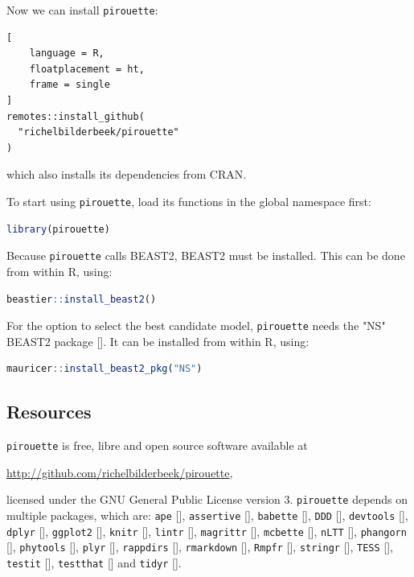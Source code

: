 Now we can install \verb;pirouette;:
\begin{lstlisting}[
    language = R,
    floatplacement = ht,
    frame = single
]
remotes::install_github(
  "richelbilderbeek/pirouette"
)
\end{lstlisting}
which also installs its dependencies from CRAN.

To start using \verb;pirouette;, 
load its functions in the global namespace first:
\begin{lstlisting}[language=R, floatplacement=ht, frame=single]
library(pirouette)
\end{lstlisting}
Because \verb;pirouette; calls BEAST2, BEAST2 must be installed. 
This can be done from within R, using:
\begin{lstlisting}[language=R, floatplacement=ht, frame=single]
beastier::install_beast2()
\end{lstlisting}
For the option to select the best candidate model,
\verb;pirouette; needs the "NS" BEAST2 package [\cite{russel2019model}].
It can be installed from within R, using:
\begin{lstlisting}[language=R, floatplacement=ht, frame=single]
mauricer::install_beast2_pkg("NS")
\end{lstlisting}

\subsection{Resources}
\label{subsec:resources}

\verb;pirouette; is free, libre and open source software available at 
\begin{sloppypar}
  \url{http://github.com/richelbilderbeek/pirouette},
\end{sloppypar}
licensed under the GNU General Public License version 3.
\verb;pirouette; depends on multiple packages, which are:
\verb;ape; [\cite{ape}],
\verb;assertive; [\cite{assertive}],
\verb;babette; [\cite{bilderbeek2018babette}],
\verb;DDD; [\cite{DDD}],
\verb;devtools; [\cite{devtools}],
\verb;dplyr; [\cite{dplyr}],
\verb;ggplot2; [\cite{ggplot2}],
\verb;knitr; [\cite{knitr}],
\verb;lintr; [\cite{lintr}],
\verb;magrittr; [\cite{magrittr}],
\verb;mcbette; [\cite{mcbette}],
\verb;nLTT; [\cite{nLTT}],
\verb;phangorn; [\cite{phangorn}],
\verb;phytools; [\cite{phytools}],
\verb;plyr; [\cite{plyr}],
\verb;rappdirs; [\cite{rappdirs}],
\verb;rmarkdown; [\cite{rmarkdown}],
\verb;Rmpfr; [\cite{Rmpfr}],
\verb;stringr; [\cite{stringr}],
\verb;TESS; [\cite{TESS,hohna2016tess}],
\verb;testit; [\cite{testit}], 
\verb;testthat; [\cite{testthat}] and
\verb;tidyr; [\cite{tidyr}].

